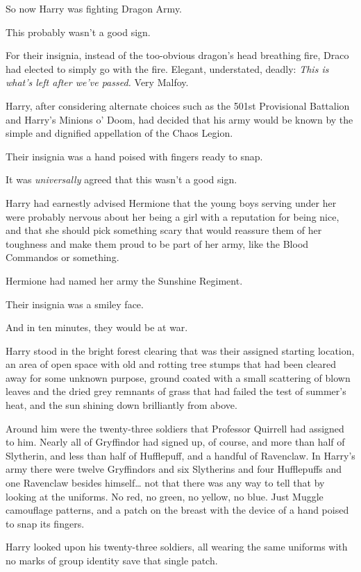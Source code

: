 So now Harry was fighting Dragon Army.

This probably wasn't a good sign.

For their insignia, instead of the too-obvious dragon's head breathing fire, Draco had elected to simply go with the fire. Elegant, understated, deadly: \emph{This is what's left after we've passed.} Very Malfoy.

Harry, after considering alternate choices such as the 501st Provisional Battalion and Harry's Minions o' Doom, had decided that his army would be known by the simple and dignified appellation of the Chaos Legion.

Their insignia was a hand poised with fingers ready to snap.

It was \emph{universally} agreed that this wasn't a good sign.

Harry had earnestly advised Hermione that the young boys serving under her were probably nervous about her being a girl with a reputation for being nice, and that she should pick something scary that would reassure them of her toughness and make them proud to be part of her army, like the Blood Commandos or something.

Hermione had named her army the Sunshine Regiment.

Their insignia was a smiley face.

And in ten minutes, they would be at war.

Harry stood in the bright forest clearing that was their assigned starting location, an area of open space with old and rotting tree stumps that had been cleared away for some unknown purpose, ground coated with a small scattering of blown leaves and the dried grey remnants of grass that had failed the test of summer's heat, and the sun shining down brilliantly from above.

Around him were the twenty-three soldiers that Professor Quirrell had assigned to him. Nearly all of Gryffindor had signed up, of course, and more than half of Slytherin, and less than half of Hufflepuff, and a handful of Ravenclaw. In Harry's army there were twelve Gryffindors and six Slytherins and four Hufflepuffs and one Ravenclaw besides himself{\ldots} not that there was any way to tell that by looking at the uniforms. No red, no green, no yellow, no blue. Just Muggle camouflage patterns, and a patch on the breast with the device of a hand poised to snap its fingers.

Harry looked upon his twenty-three soldiers, all wearing the same uniforms with no marks of group identity save that single patch.

